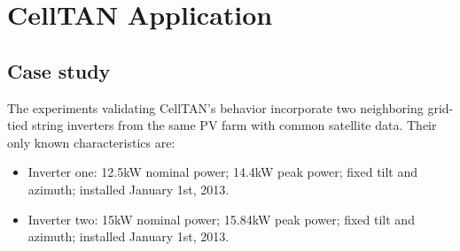 \chapter{CellTAN Application} \label{chap:chap5}


\section{Case study}


The experiments validating CellTAN's behavior incorporate two neighboring grid-tied string inverters from the same PV farm with common satellite data. Their only known characteristics are:

\begin{itemize}
    \item Inverter one: 12.5kW nominal power; 14.4kW peak power; fixed tilt and azimuth; installed January 1st, 2013.
    \item Inverter two: 15kW nominal power; 15.84kW peak power; fixed tilt and azimuth; installed January 1st, 2013.
\end{itemize}

